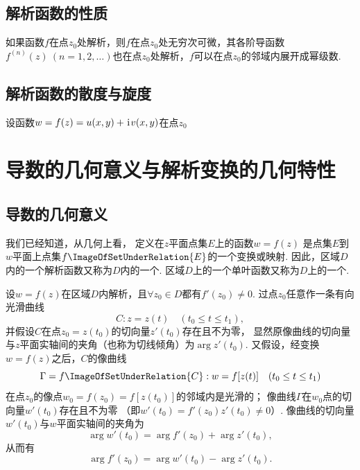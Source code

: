 \subsection{解析函数的性质}
如果函数\(f\)在点\(z_0\)处解析，则\(f\)在点\(z_0\)处无穷次可微，其各阶导函数\(f^{(n)}(z)\ (n=1,2,\dotsc)\)也在点\(z_0\)处解析，\(f\)可以在点\(z_0\)的邻域内展开成幂级数.

\subsection{解析函数的散度与旋度}
设函数\(w=f(z)=u(x,y)+\kern1pt\mathrm{i}\kern1pt v(x,y)\)在点\(z_0\)

\section{导数的几何意义与解析变换的几何特性}
\subsection{导数的几何意义}
我们已经知道，从几何上看，
定义在\(z\)平面点集\(E\)上的函数\(w = f(z)\)
是点集\(E\)到\(w\)平面上点集\(f\ImageOfSetUnderRelation{E}\)的一个变换或映射.
因此，区域\(D\)内的一个解析函数又称为\(D\)内的一个.
区域\(D\)上的一个单叶函数又称为\(D\)上的一个.

设\(w = f(z)\)在区域\(D\)内解析，且\(\forall z_0 \in D\)都有\(f'(z_0) \neq 0\).
过点\(z_0\)任意作一条有向光滑曲线\begin{equation*}
	C: z = z(t)
	\quad(t_0 \leq t \leq t_1),
\end{equation*}
并假设\(C\)在点\(z_0 = z(t_0)\)的切向量\(z'(t_0)\)存在且不为零，
显然原像曲线的切向量与\(z\)平面实轴间的夹角（也称为切线倾角）为\(\arg z'(t_0)\).
又假设，经变换\(w = f(z)\)之后，\(C\)的像曲线\begin{equation*}
	\Gamma = f\ImageOfSetUnderRelation{C}: w = f[z(t)]
	\quad(t_0 \leq t \leq t_1)
\end{equation*}在点\(z_0\)的像点\(w_0 = f(z_0) = f[z(t_0)]\)的邻域内是光滑的；
像曲线\(\Gamma\)在\(w_0\)点的切向量\(w'(t_0)\)存在且不为零
（即\(w'(t_0) = f'(z_0) z'(t_0) \neq 0\)）.
像曲线的切向量\(w'(t_0)\)与\(w\)平面实轴间的夹角为\begin{equation*}
	\arg w'(t_0) = \arg f'(z_0) + \arg z'(t_0),
\end{equation*}
从而有\begin{equation}\label{equation:解析函数.导函数的辐角的几何意义}
	\arg f'(z_0) = \arg w'(t_0) - \arg z'(t_0).
\end{equation}


